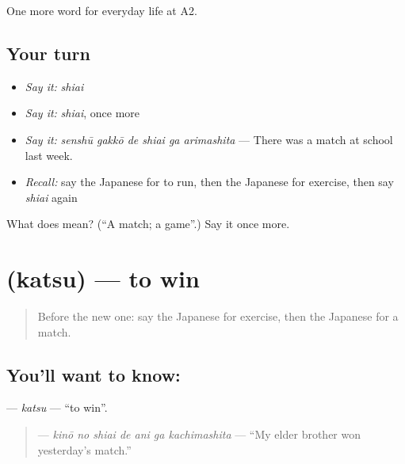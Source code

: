 \begin{grammarlens}[title={What you've built}]
One more word for everyday life at A2.
\end{grammarlens}

\subsection*{Your turn}
\begin{itemize}
\raggedright
  \item \emph{Say it:} \emph{shiai}
  \item \emph{Say it:} \emph{shiai}, once more
  \item \emph{Say it:} \emph{senshū gakkō de shiai ga arimashita} — There was a match at school last week.
  \item \emph{Recall:} say the Japanese for to run, then the Japanese for exercise, then say \emph{shiai} again
\end{itemize}

\begin{tcolorbox}[breakable,colback=teal!4,colframe=teal!35!black,title={Before you move on}]
What does  mean? (\textquotedblleft{}A match; a game\textquotedblright{}.) Say it once more.
\end{tcolorbox}
\section[\texorpdfstring{\ja{かつ} (katsu)}{かつ (katsu)}]{ (katsu) — to win}

\label{lesson:JA-C234-katsu}



\begin{quote}
Before the new one: say the Japanese for exercise, then the Japanese for a match.
\end{quote}

\subsection*{You'll want to know: }
\textbf{} — \emph{katsu} — \textquotedblleft{}to win\textquotedblright{}.

\begin{quote}
\textbf{   } — \emph{kinō no shiai de ani ga kachimashita} — \textquotedblleft{}My elder brother won yesterday's match.\textquotedblright{}
\end{quote}

